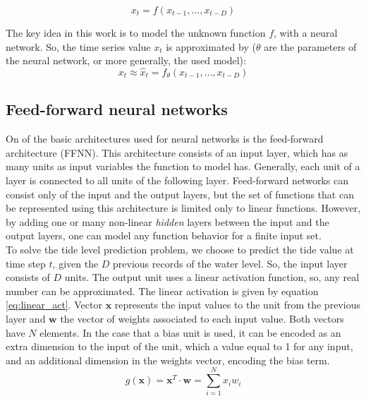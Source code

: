 \documentclass[10pt,a4paper]{article}
\begin{document}
\begin{equation}
x_{t} = f(x_{t-1}, \ldots, x_{t-D})
\end{equation}

The key idea in this work is to model the unknown function $f$, with a neural network. So, the time series value $x_t$ is approximated by ($\theta$ are the parameters of the neural network, or more generally, the used model):
\begin{equation}
x_{t} \approx \hat{x}_t = f_\theta(x_{t-1}, \ldots, x_{t-D})
\end{equation}

\subsection{Feed-forward neural networks}
On of the basic architectures used for neural networks is the feed-forward architecture (FFNN). This architecture consists of an input layer, which has as many units as input variables the function to model has. Generally, each unit of a layer is connected to all units of the following layer. Feed-forward networks can consist only of the input and the output layers, but the set of functions that can be represented using this architecture is limited only to linear functions. However, by adding one or many non-linear \emph{hidden} layers between the input and the output layers, one can model any function behavior for a finite input set.\\

To solve the tide level prediction problem, we choose to predict the tide value at time step $t$, given the $D$ previous records of the water level. So, the input layer consists of $D$ units. The output unit uses a linear activation function, so, any real number can be approximated. The linear activation is given by equation \ref{eq:linear_act}. Vector $\mathbf{x}$ represents the input values to the unit from the previous layer and $\mathbf{w}$ the vector of weights associated to each input value. Both vectors have $N$ elements. In the case that a bias unit is used, it can be encoded as an extra dimension to the input of the unit, which a value equal to 1 for any input, and an additional dimension in the weights vector, encoding the bias term.\\

\begin{equation}\label{eq:linear_act}
g(\mathbf{x}) = \mathbf{x}^T \cdot \mathbf{w} = \sum_{i=1}^N x_i w_i
\end{equation}
\end{document}

